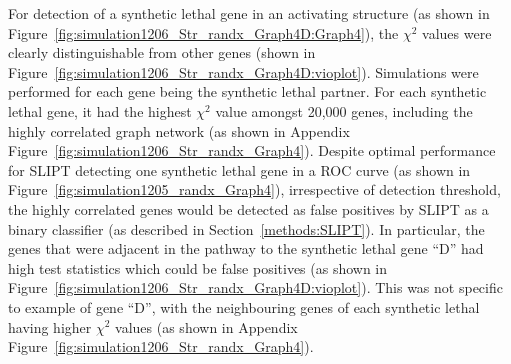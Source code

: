 For detection of a \gls{synthetic lethal} gene in an activating  structure (as shown in Figure~\ref{fig:simulation1206_Str_randx_Graph4D:Graph4}), the $\chi^2$ values were clearly distinguishable from other genes (shown in Figure~\ref{fig:simulation1206_Str_randx_Graph4D:vioplot}). Simulations were performed for each gene being the \gls{synthetic lethal} partner. For each \gls{synthetic lethal} gene, it had the highest $\chi^2$ value amongst 20,000 genes, including the highly correlated graph network (as shown in Appendix Figure~\ref{fig:simulation1206_Str_randx_Graph4}).
%
Despite optimal performance for \gls{SLIPT} detecting one \gls{synthetic lethal} gene in a \gls{ROC} curve (as shown in Figure~\ref{fig:simulation1205_randx_Graph4}), irrespective of detection threshold, the highly correlated genes would be detected as false positives by \gls{SLIPT} as a binary classifier (as described in Section~\ref{methods:SLIPT}). In particular, the genes that were adjacent in the \gls{pathway} to the \gls{synthetic lethal} gene ``D''  had high test statistics which could be false positives (as shown in Figure~\ref{fig:simulation1206_Str_randx_Graph4D:vioplot}). This was not specific to example of gene ``D'', with the neighbouring genes of each \gls{synthetic lethal} having higher $\chi^2$ values (as shown in Appendix Figure~\ref{fig:simulation1206_Str_randx_Graph4}).

